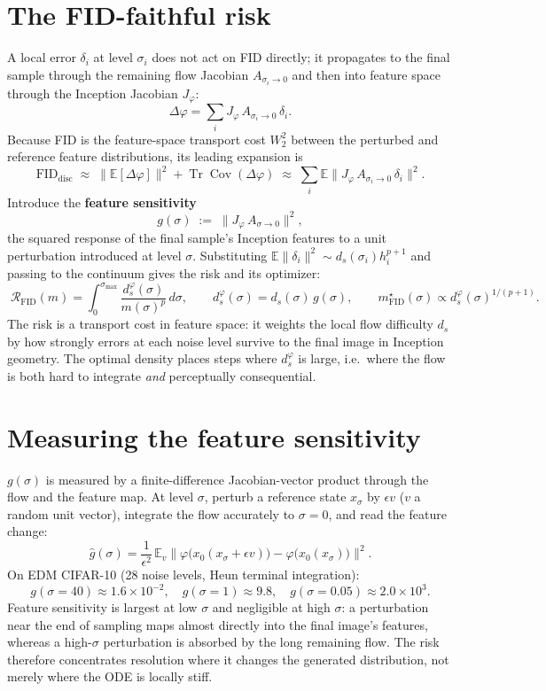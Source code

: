 \documentclass[11pt]{article}
\begin{document}
\section{The FID-faithful risk}
\label{sec:risk}

A local error $\delta_i$ at level $\sigma_i$ does not act on FID directly;
it propagates to the final sample through the remaining flow Jacobian
$A_{\sigma_i\to 0}$ and then into feature space through the Inception
Jacobian $J_\varphi$:
\[
\Delta\varphi=\sum_i J_\varphi\,A_{\sigma_i\to 0}\,\delta_i .
\]
Because FID is the feature-space transport cost
$W_2^2$ between the perturbed and reference feature distributions, its
leading expansion is
\[
\mathrm{FID}_{\mathrm{disc}}
\;\approx\;\bigl\lVert\mathbb E[\Delta\varphi]\bigr\rVert^2
+\operatorname{Tr}\operatorname{Cov}(\Delta\varphi)
\;\approx\;\sum_i \mathbb E\bigl\lVert J_\varphi\,A_{\sigma_i\to 0}\,\delta_i\bigr\rVert^2 .
\]
Introduce the \textbf{feature sensitivity}
\[
g(\sigma)\;:=\;\bigl\lVert J_\varphi\,A_{\sigma\to 0}\bigr\rVert^2 ,
\]
the squared response of the final sample's Inception features to a unit
perturbation introduced at level $\sigma$. Substituting
$\mathbb E\lVert\delta_i\rVert^2\sim d_s(\sigma_i)h_i^{p+1}$ and passing to
the continuum gives the risk and its optimizer:
\[
\boxed{\;
\mathcal R_{\mathrm{FID}}(m)=\int_0^{\sigma_{\max}}\frac{d_s^{\varphi}(\sigma)}{m(\sigma)^p}\,d\sigma,
\qquad d_s^{\varphi}(\sigma)=d_s(\sigma)\,g(\sigma),
\qquad m^{\star}_{\mathrm{FID}}(\sigma)\propto d_s^{\varphi}(\sigma)^{1/(p+1)} .
\;}
\]
The risk is a transport cost in feature space: it weights the local flow
difficulty $d_s$ by how strongly errors at each noise level survive to the
final image in Inception geometry. The optimal density places steps where
$d_s^{\varphi}$ is large, i.e.\ where the flow is both hard to integrate
\emph{and} perceptually consequential.

\section{Measuring the feature sensitivity}
\label{sec:estimator}

$g(\sigma)$ is measured by a finite-difference Jacobian-vector product
through the flow and the feature map. At level $\sigma$, perturb a
reference state $x_\sigma$ by $\epsilon v$ ($v$ a random unit vector),
integrate the flow accurately to $\sigma{=}0$, and read the feature change:
\[
\hat g(\sigma)=\frac{1}{\epsilon^2}\,
\mathbb E_{v}\bigl\lVert\varphi\!\bigl(x_0(x_\sigma+\epsilon v)\bigr)
-\varphi\!\bigl(x_0(x_\sigma)\bigr)\bigr\rVert^2 .
\]
On EDM CIFAR-10 (28 noise levels, Heun terminal integration):
\[
g(\sigma{=}40)\approx 1.6\times10^{-2},\quad
g(\sigma{=}1)\approx 9.8,\quad
g(\sigma{=}0.05)\approx 2.0\times10^{3}.
\]
Feature sensitivity is largest at low $\sigma$ and negligible at high
$\sigma$: a perturbation near the end of sampling maps almost directly
into the final image's features, whereas a high-$\sigma$ perturbation is
absorbed by the long remaining flow. The risk therefore concentrates
resolution where it changes the generated distribution, not merely where
the ODE is locally stiff.
\end{document}
